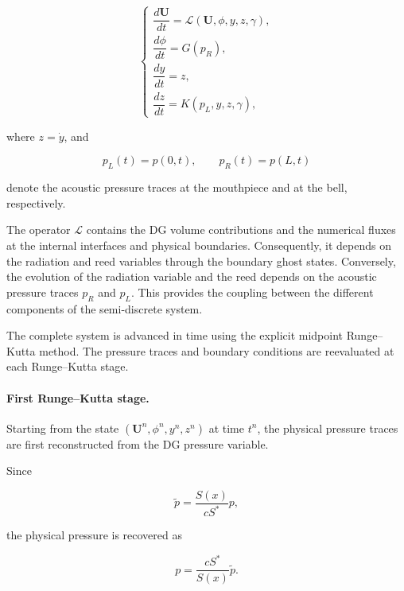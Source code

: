 \documentclass[11pt,a4paper]{report}
\theoremstyle{plain}
\theoremstyle{definition}
\begin{document}
\begin{equation}
\boxed{
\begin{cases}
\dfrac{d\mathbf U}{dt}
=
\mathcal L
\left(
\mathbf U,\phi,y,z,\gamma
\right),
\\[0.6em]
\dfrac{d\phi}{dt}
=
G(p_R),
\\[0.6em]
\dfrac{dy}{dt}
=
z,
\\[0.6em]
\dfrac{dz}{dt}
=
K(p_L,y,z,\gamma),
\end{cases}
}
\label{eq:rk2_coupled_system}
\end{equation}

where \(z=\dot y\), and

\begin{equation}
p_L(t)=p(0,t),
\qquad
p_R(t)=p(L,t)
\end{equation}

denote the acoustic pressure traces at the mouthpiece and at the bell,
respectively.

The operator \(\mathcal L\) contains the DG volume contributions and the
numerical fluxes at the internal interfaces and physical boundaries.
Consequently, it depends on the radiation and reed variables through the
boundary ghost states. Conversely, the evolution of the radiation variable
and the reed depends on the acoustic pressure traces \(p_R\) and \(p_L\).
This provides the coupling between the different components of the
semi-discrete system.

The complete system is advanced in time using the explicit midpoint
Runge--Kutta method. The pressure traces and boundary conditions are
reevaluated at each Runge--Kutta stage.

\paragraph{First Runge--Kutta stage.}

Starting from the state
\(
(\mathbf U^n,\phi^n,y^n,z^n)
\)
at time \(t^n\), the physical pressure traces are first reconstructed from
the DG pressure variable.

Since

\begin{equation}
\tilde p
=
\frac{S(x)}{cS^\ast}p,
\end{equation}

the physical pressure is recovered as

\begin{equation}
p
=
\frac{cS^\ast}{S(x)}\tilde p.
\end{equation}
\end{document}
